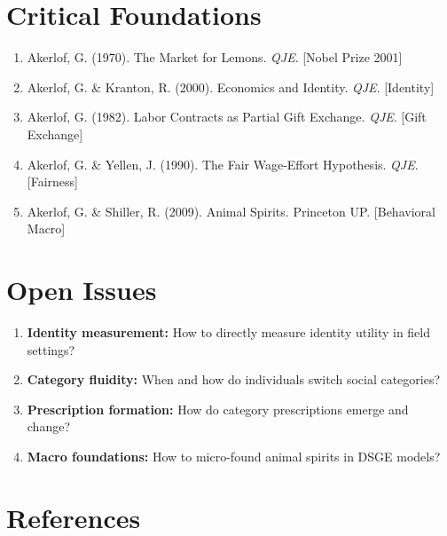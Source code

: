 \section{Critical Foundations}

\begin{enumerate}
    \item Akerlof, G. (1970). The Market for Lemons. \textit{QJE}. [Nobel Prize 2001]
    \item Akerlof, G. \& Kranton, R. (2000). Economics and Identity. \textit{QJE}. [Identity]
    \item Akerlof, G. (1982). Labor Contracts as Partial Gift Exchange. \textit{QJE}. [Gift Exchange]
    \item Akerlof, G. \& Yellen, J. (1990). The Fair Wage-Effort Hypothesis. \textit{QJE}. [Fairness]
    \item Akerlof, G. \& Shiller, R. (2009). Animal Spirits. Princeton UP. [Behavioral Macro]
\end{enumerate}

\section{Open Issues}

\begin{enumerate}
    \item \textbf{Identity measurement:} How to directly measure identity utility in field settings?
    \item \textbf{Category fluidity:} When and how do individuals switch social categories?
    \item \textbf{Prescription formation:} How do category prescriptions emerge and change?
    \item \textbf{Macro foundations:} How to micro-found animal spirits in DSGE models?
\end{enumerate}

\section{References}

